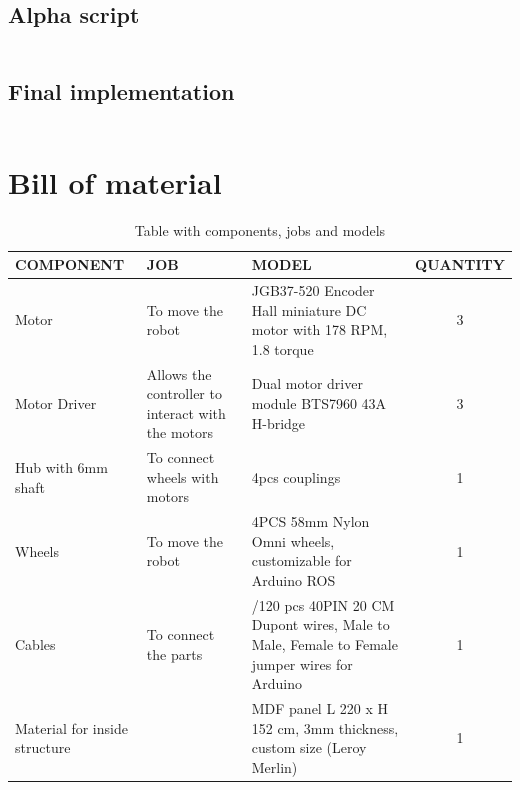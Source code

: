 \documentclass{article}
\begin{document}
\newpage
\subsection{Alpha script}
\begin{lstlisting}[language=C, basicstyle=\ttfamily\footnotesize, frame=single, xleftmargin=10mm, xrightmargin=10mm]

\end{lstlisting}


\newpage
\subsection{Final implementation}
\begin{lstlisting}[language=C, basicstyle=\ttfamily\footnotesize, frame=single, xleftmargin=10mm, xrightmargin=10mm]

\end{lstlisting}

\newpage
\section{Bill of material}
\begin{table}[ht]
\centering
\begin{tabular}{|>{\raggedright\arraybackslash}p{4cm}|>{\raggedright\arraybackslash}p{3cm}|>{\raggedright\arraybackslash}p{6cm}|c|}
\hline
\textbf{COMPONENT} & \textbf{JOB} & \textbf{MODEL} & \textbf{QUANTITY} \\ \hline
Motor & To move the robot & JGB37-520 Encoder Hall miniature DC motor with 178 RPM, 1.8 torque & 3 \\ \hline
Motor Driver & Allows the controller to interact with the motors & Dual motor driver module BTS7960 43A H-bridge & 3 \\ \hline
Hub with 6mm shaft & To connect wheels with motors & 6mm 4pcs couplings & 1 \\ \hline
Wheels & To move the robot & 4PCS 58mm Nylon Omni wheels, customizable for Arduino ROS & 1 \\ \hline
Cables & To connect the parts & 40/120 pcs 40PIN 20 CM Dupont wires, Male to Male, Female to Female jumper wires for Arduino & 1 \\ \hline
Material for inside structure & & MDF panel L 220 x H 152 cm, 3mm thickness, custom size (Leroy Merlin) & 1 \\ \hline
\end{tabular}
\caption{Table with components, jobs and models}
\label{tab:components}
\end{table}
\end{document}

